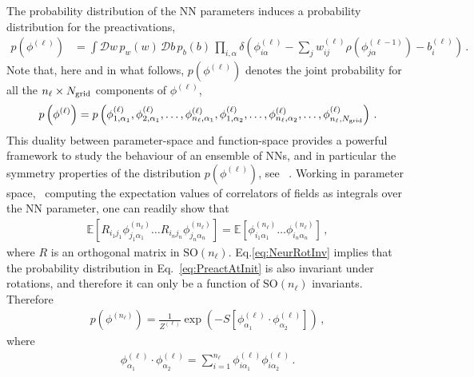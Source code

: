 The probability distribution of the NN parameters induces a probability distribution for the
preactivations,
\begin{align}
    \label{eq:PreactAtInit}
    p\left(\phi^{(\ell)}\right)
      &= \int \mathcal{D}w\, p_w(w)\,
        \mathcal{D}b\, p_b(b)\, \prod_{i,\alpha}
        \delta\left(
          \phi^{(\ell)}_{i\alpha} - \sum_{j} w^{(\ell)}_{ij}
          \rho\left(\phi^{(\ell-1)}_{j\alpha}\right)
          - b^{(\ell)}_i
          \right)\, .
\end{align}
Note that, here and in what follows, $p(\phi^{(\ell)})$ denotes the joint probability for all the
$n_{\ell}\times N_{\mathrm{grid}}$ components of $\phi^{(\ell)}$,
\begin{align}
    \label{eq:ExplIndices}
    p\left(\phi^{(\ell)}\right) = p\left(\phi^{(\ell)}_{1,\alpha_1}, \phi^{(\ell)}_{2,\alpha_1}, \ldots,
        \phi^{(\ell)}_{n_\ell,\alpha_1}, \phi^{(\ell)}_{1,\alpha_2}, \ldots, \phi^{(\ell)}_{n_\ell,\alpha_2},
        \ldots,
        \phi^{(\ell)}_{n_\ell,N_{\mathrm{grid}}}\right)\, .
\end{align}
This duality between parameter-space and function-space provides a powerful framework to study
the behaviour of an ensemble of NNs, and in particular the symmetry properties of the distribution
$p(\phi^{(\ell)})$, see \eg~\cite{Maiti:2021fpy}. Working in parameter space, \ie\ computing the
expectation values of correlators of fields as integrals over the NN parameter, one can readily
show that
\begin{align}
    \label{eq:NeurRotInv}
    \mathbb{E}\left[
        R_{i_1j_1} \phi^{(n_\ell)}_{j_1 \alpha_1} \ldots
        R_{i_nj_n} \phi^{(n_\ell)}_{j_n \alpha_n}
    \right] =
    \mathbb{E}\left[
        \phi^{(n_\ell)}_{i_1 \alpha_1} \ldots
        \phi^{(n_\ell)}_{i_n \alpha_n}
    \right]\, ,
\end{align}
where $R$ is an orthogonal matrix in $\text{SO}(n_{\ell})$. Eq.\eqref{eq:NeurRotInv} implies
that the probability distribution in Eq.~\eqref{eq:PreactAtInit} is also invariant under rotations,
and therefore it can only be a function of $\text{SO}(n_{\ell})$ invariants. Therefore
\begin{align}
    \label{eq:PriorAction}
    p\left(\phi^{(n_\ell)}\right) =
        \frac{1}{Z^{(\ell)}} \exp\left(-S\left[\phi^{(\ell)}_{\alpha_1}
            \cdot \phi^{(\ell)}_{\alpha_2}\right]\right)\, ,
\end{align}
where
\begin{align}
    \label{eq:PhiInvariant}
    \phi^{(\ell)}_{\alpha_1}
            \cdot \phi^{(\ell)}_{\alpha_2} =
    \sum_{i=1}^{n_\ell} \phi^{(\ell)}_{i \alpha_1} \phi^{(\ell)}_{i \alpha_2}\, .
\end{align}
